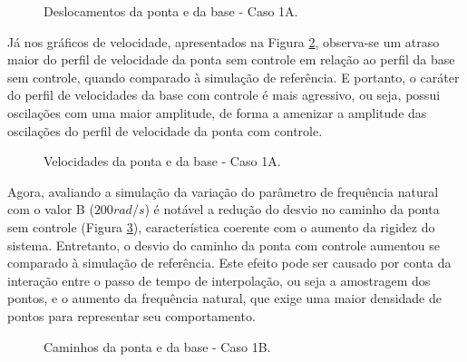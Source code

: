\begin{figure}[H]
    \centering
    \hfill
    \caption{Deslocamentos da ponta e da base - Caso 1A.}
    \label{fig:1A_des}
\end{figure}

Já nos gráficos de velocidade, apresentados na Figura \ref{fig:1A_vel}, observa-se um atraso maior do perfil de velocidade da ponta sem controle em relação ao perfil da base sem controle, quando comparado à simulação de referência. E portanto, o caráter do perfil de velocidades da base com controle é mais agressivo, ou seja, possui oscilações com uma maior amplitude, de forma a amenizar a amplitude das oscilações do perfil de velocidade da ponta com controle.
\begin{figure}[H]
    \centering
    \hfill
    \caption{Velocidades da ponta e da base - Caso 1A.}
    \label{fig:1A_vel}
\end{figure}

Agora, avaliando a simulação da variação do parâmetro de frequência natural com o valor B (\(200 rad/s\)) é notável a redução do desvio no caminho da ponta sem controle (Figura \ref{fig:1B_cam}), característica coerente com o aumento da rigidez do sistema. Entretanto, o desvio do caminho da ponta com controle aumentou se comparado à simulação de referência. Este efeito pode ser causado por conta da interação entre o passo de tempo de interpolação, ou seja a amostragem dos pontos, e o aumento da frequência natural, que exige uma maior densidade de pontos para representar seu comportamento. 

\begin{figure}[H]
    \centering
    \hfill
    \hfill
    \hfill
    \caption{Caminhos da ponta e da base - Caso 1B.}
    \label{fig:1B_cam}
\end{figure}

